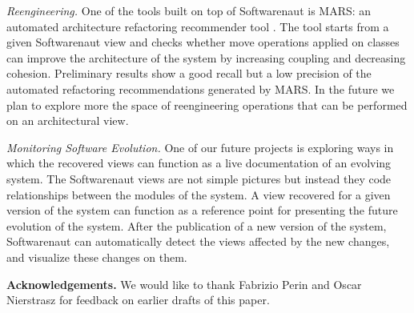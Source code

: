 \documentclass[preprint,12pt]{elsarticle}
\begin{document}
\begin{description}

\item {\em Reengineering.}
One of the tools built on top of Softwarenaut is MARS: an automated architecture refactoring recommender tool \cite{boeckmann-mars}. The tool starts from a given Softwarenaut view and checks whether move operations applied on classes can improve the architecture of the system by increasing coupling and decreasing cohesion. Preliminary results show a good recall but a low precision of the  automated refactoring recommendations generated by MARS. In the future we plan to explore more the space of reengineering operations that can be performed on an architectural view.


\item {\em Monitoring Software Evolution.}
One of our future projects is exploring ways in which the recovered views can function as a live documentation of an evolving system. The Softwarenaut views are not simple pictures but instead they code relationships between the modules of the system. A view recovered for a given version of the system can function as a reference point for presenting the future evolution of the system. After the publication of a new version of the system, Softwarenaut can automatically detect the views affected by the new changes, and visualize these changes on them.

\end{description}


\vspace{0.5cm}
\footnotesize
{\bf Acknowledgements.} We would like to thank Fabrizio Perin and Oscar Nierstrasz for feedback on earlier drafts of this paper.



\newpage

\footnotesize



\end{document}
